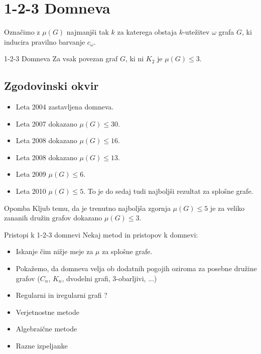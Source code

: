\documentclass{beamer}
\begin{document}
\section{1-2-3 Domneva}
\begin{frame}
\begin{block}{}
	Označimo z $\mu(G)$ najmanjši tak $k$ za katerega obstaja $k$-utežitev $\omega$ grafa $G$, ki inducira pravilno barvanje $c_{\omega}$.
\end{block}
\begin{block}{1-2-3 Domneva}
	Za vsak povezan graf $G$, ki ni $K_2$ je $\mu(G) \le 3$.
\end{block}
\end{frame}

\subsection{Zgodovinski okvir}
\begin{frame}
\begin{itemize}
	\item Leta 2004 zastavljena domneva.
	\item Leta 2007 dokazano $\mu(G) \le 30$.
	\item Leta 2008 dokazano $\mu(G) \le 16$.
	\item Leta 2008 dokazano $\mu(G) \le 13$.
	\item Leta 2009 $\mu(G) \le 6$.
	\item Leta 2010 $\mu(G) \le 5$. To je do sedaj tudi najboljši rezultat za splošne grafe.
\end{itemize}

\begin{block}{Opomba}
	Kljub temu, da je trenutno najboljša zgornja $\mu(G) \le 5$ je za veliko zananih družin grafov dokazano $\mu(G) \le 3$. 
\end{block}
\end{frame}

\begin{frame}{Pristopi k 1-2-3 domnevi}
	Nekaj metod in pristopov k domnevi:\pause
	\begin{itemize}
		\item Iskanje čim nižje meje za $\mu$ za splošne grafe. \pause
		\item Pokažemo, da domneva velja ob dodatnih pogojih oziroma za posebne družine grafov ($C_n$, $K_n$, dvodelni grafi, $3$-obarljivi, ...) \pause
		\item Regularni in iregularni grafi ? \pause
		\item Verjetnostne metode \pause
		\item Algebraične metode \pause
		\item Razne izpeljanke
		
	\end{itemize}	
	
	

\end{frame}
\end{document}
